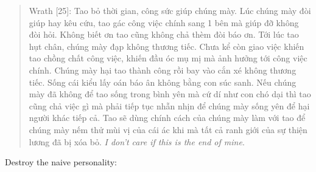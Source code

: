 \documentclass[12pt]{article}
\begin{document}
\begin{quote}
	{\sf Wrath [25]}: Tao bỏ thời gian, công sức giúp chúng mày. Lúc chúng mày đòi giúp hay kêu cứu, tao gác công việc chính sang 1 bên mà giúp đỡ không đòi hỏi. Không biết ơn tao cũng không chả thèm đòi báo ơn. Tới lúc tao hụt chân, chúng mày đạp không thương tiếc. Chưa kể còn giao việc khiến tao chồng chất công việc, khiến đầu óc mụ mị mà ảnh hưởng tới công việc chính. Chúng mày hại tao thành công rồi bay vào cắn xé không thương tiếc. Sống cái kiểu lấy oán báo ân không bằng con súc sanh. Nếu chúng mày đã không để tao sống trong bình yên mà cứ dí như con chó dại thì tao cũng chả việc gì mà phải tiếp tục nhẫn nhịn để chúng mày sống yên để hại người khác tiếp cả. Tao sẽ dùng chính cách của chúng mày làm với tao để chúng mày nếm thử mùi vị của cái ác khi mà tất cả ranh giới của sự thiện lương đã bị xóa bỏ. {\it I don't care if this is the end of mine}.
\end{quote}
Destroy the naive personality:
\end{document}
